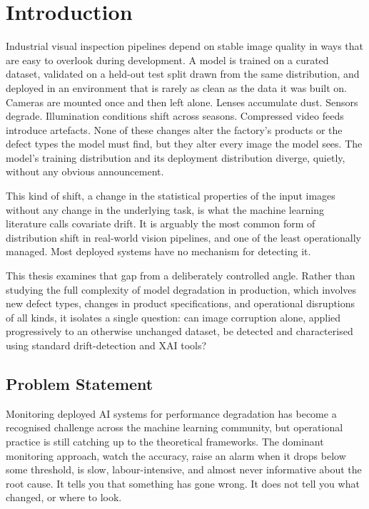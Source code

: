 
\chapter{Introduction}%
\label{ch:inleiding}

Industrial visual inspection pipelines depend on stable image quality in ways that are easy to overlook during development. A model is trained on a curated dataset, validated on a held-out test split drawn from the same distribution, and deployed in an environment that is rarely as clean as the data it was built on. Cameras are mounted once and then left alone. Lenses accumulate dust. Sensors degrade. Illumination conditions shift across seasons. Compressed video feeds introduce artefacts. None of these changes alter the factory's products or the defect types the model must find, but they alter every image the model sees. The model's training distribution and its deployment distribution diverge, quietly, without any obvious announcement.

This kind of shift, a change in the statistical properties of the input images without any change in the underlying task, is what the machine learning literature calls covariate drift. It is arguably the most common form of distribution shift in real-world vision pipelines, and one of the least operationally managed. Most deployed systems have no mechanism for detecting it.

This thesis examines that gap from a deliberately controlled angle. Rather than studying the full complexity of model degradation in production, which involves new defect types, changes in product specifications, and operational disruptions of all kinds, it isolates a single question: can image corruption alone, applied progressively to an otherwise unchanged dataset, be detected and characterised using standard drift-detection and XAI tools?

\section{Problem Statement}%
\label{sec:probleemstelling}

Monitoring deployed AI systems for performance degradation has become a recognised challenge across the machine learning community, but operational practice is still catching up to the theoretical frameworks. The dominant monitoring approach, watch the accuracy, raise an alarm when it drops below some threshold, is slow, labour-intensive, and almost never informative about the root cause. It tells you that something has gone wrong. It does not tell you what changed, or where to look.

